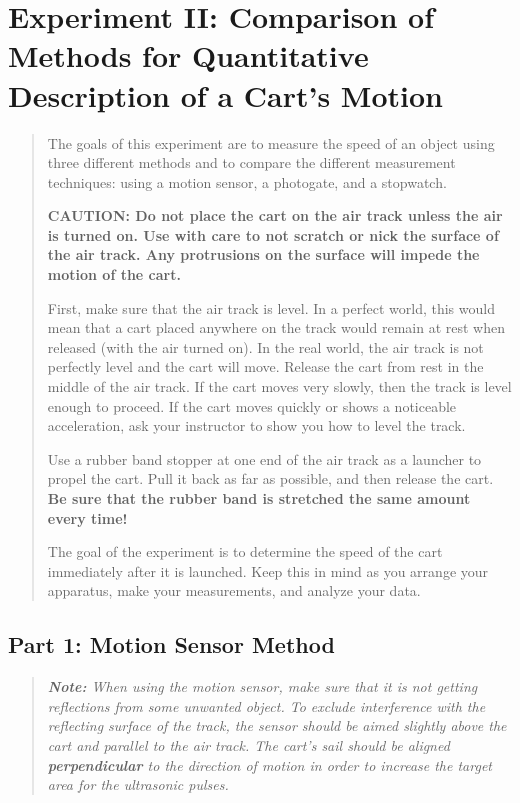 \documentclass[8pt]{extarticle}
\begin{document}
{\section*{Experiment II: Comparison of Methods for Quantitative Description of a Cart's Motion}
\begin{quote}
	The goals of this experiment are to measure the speed of an object using three different methods and to compare the different measurement techniques: using a motion sensor, a photogate, and a stopwatch.
	
	\textbf{CAUTION:  Do not place the cart on the air track unless the air is turned on.  Use with care to not scratch or nick the surface of the air track.  Any protrusions on the surface will impede the motion of the cart.}
	
	First, make sure that the air track is level.  In a perfect world, this would mean that a cart placed anywhere on the track would remain at rest when released (with the air turned on).  In the real world, the air track is not perfectly level and the cart will move.  Release the cart from rest in the middle of the air track.  If the cart moves very slowly, then the track is level enough to proceed.  If the cart moves quickly or shows a noticeable acceleration, ask your instructor to show you how to level the track.
	
	Use a rubber band stopper at one end of the air track as a launcher to propel the cart.  Pull it back as far as possible, and then release the cart.  \textbf{Be sure that the rubber band is stretched the same amount every time!}
	
	The goal of the experiment is to determine the speed of the cart immediately after it is launched.  Keep this in mind as you arrange your apparatus, make your measurements, and analyze your data.
\end{quote}
\subsection*{Part 1: Motion Sensor Method}
\begin{quote}
	\textit{\textbf{Note:} When using the motion sensor, make sure that it is not getting reflections from some unwanted object.  To exclude interference with the reflecting surface of the track, the sensor should be aimed slightly above the cart and parallel to the air track.  The cart’s sail should be aligned \textbf{perpendicular} to the direction of motion in order to increase the target area for the ultrasonic pulses.}
	

\end{quote}}
\end{document}
